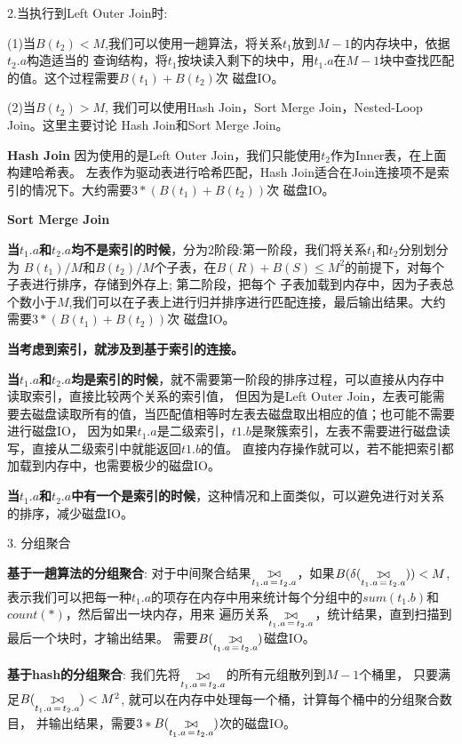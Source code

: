 \documentclass[UTF8]{ctexart}
\def\ojoin{\setbox0=\hbox{$\bowtie$}%
  \rule[-.02ex]{.25em}{.4pt}\llap{\rule[\ht0]{.25em}{.4pt}}}
\def\leftouterjoin{\mathbin{\ojoin\mkern-5.8mu\bowtie}}
\begin{document}
2.当执行到Left Outer Join时:

(1)当$B(t_2)<M$,我们可以使用一趟算法，将关系$t_1$放到$M-1$的内存块中，依据$t_2.a$构造适当的
查询结构，将$t_1$按块读入剩下的块中，用$t_1.a$在$M-1$块中查找匹配的值。这个过程需要$B(t_1)+B(t_2)$次
磁盘IO。

(2)当$B(t_2)>M$, 我们可以使用Hash Join，Sort Merge Join，Nested-Loop Join。这里主要讨论
Hash Join和Sort Merge Join。

\textbf{Hash Join}
因为使用的是Left Outer Join，我们只能使用$t_2$作为Inner表，在上面构建哈希表。
左表作为驱动表进行哈希匹配，Hash Join适合在Join连接项不是索引的情况下。大约需要$3*(B(t_1)+B(t_2))$次
磁盘IO。

\textbf{Sort Merge Join} 

\textbf{当$t_1.a$和$t_2.a$均不是索引的时候}，分为2阶段:第一阶段，我们将关系$t_1$和$t_2$分别划分为
$B(t_1)/M$和$B(t_2)/M$个子表，在$B(R)+B(S) \leq M^2$的前提下，对每个子表进行排序，存储到外存上; 第二阶段，把每个
子表加载到内存中，因为子表总个数小于$M$,我们可以在子表上进行归并排序进行匹配连接，最后输出结果。大约需要$3*(B(t_1)+B(t_2))$次
磁盘IO。

\textbf{当考虑到索引，就涉及到基于索引的连接。}

\textbf{当$t_1.a$和$t_2.a$均是索引的时候}，就不需要第一阶段的排序过程，可以直接从内存中读取索引，直接比较两个关系的索引值，
但因为是Left Outer Join，左表可能需要去磁盘读取所有的值，当匹配值相等时左表去磁盘取出相应的值；也可能不需要进行磁盘IO，
因为如果$t_1.a$是二级索引，$t1.b$是聚簇索引，左表不需要进行磁盘读写，直接从二级索引中就能返回$t1.b$的值。
直接内存操作就可以，若不能把索引都加载到内存中，也需要极少的磁盘IO。

\textbf{当$t_1.a$和$t_2.a$中有一个是索引的时候}，这种情况和上面类似，可以避免进行对关系的排序，减少磁盘IO。

3. 分组聚合

\textbf{基于一趟算法的分组聚合}: 对于中间聚合结果$\mathop{\leftouterjoin}\limits_{t_1.a\,=\,t_2.a}$，如果$B(\delta(\mathop{\leftouterjoin}\limits_{t_1.a\,=\,t_2.a}))<M$,
表示我们可以把每一种$t_1.a$的项存在内存中用来统计每个分组中的$sum(t_1.b)$和$count(*)$，然后留出一块内存，用来
遍历关系$\mathop{\leftouterjoin}\limits_{t_1.a\,=\,t_2.a}$，统计结果，直到扫描到最后一个块时，才输出结果。
需要$B(\mathop{\leftouterjoin}\limits_{t_1.a\,=\,t_2.a})$磁盘IO。

\textbf{基于hash的分组聚合}: 我们先将$\mathop{\leftouterjoin}\limits_{t_1.a\,=\,t_2.a}$的所有元组散列到$M-1$个桶里，
只要满足$B(\mathop{\leftouterjoin}\limits_{t_1.a\,=\,t_2.a})<M^2$, 就可以在内存中处理每一个桶，计算每个桶中的分组聚合数目，
并输出结果，需要$3*B(\mathop{\leftouterjoin}\limits_{t_1.a\,=\,t_2.a})$次的磁盘IO。
\end{document}
